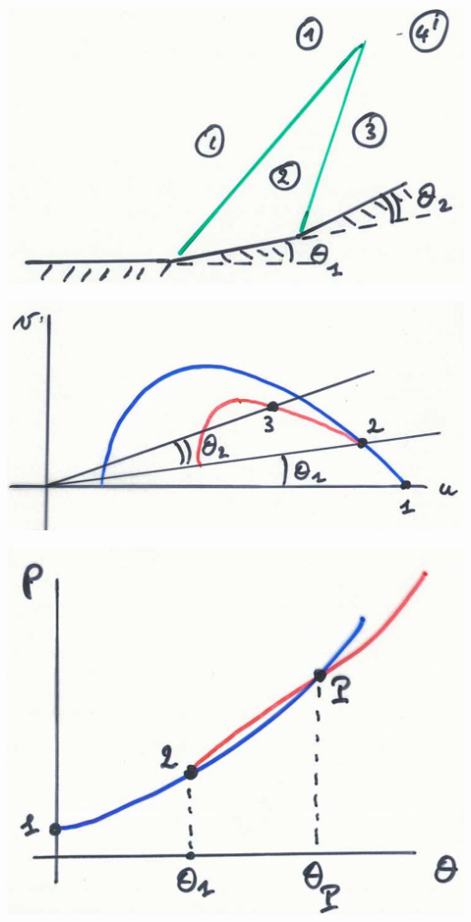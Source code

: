 	\begin{center}
\begin{minipage}{0.33\textwidth}
\includegraphics[scale=0.2]{ch9/15}
\end{minipage}
\begin{minipage}{0.4\textwidth}
\includegraphics[scale=0.2]{ch9/16}
\end{minipage}
\begin{minipage}{0.25\textwidth}
\includegraphics[scale=0.2]{ch9/17}
\end{minipage}
\end{center}

